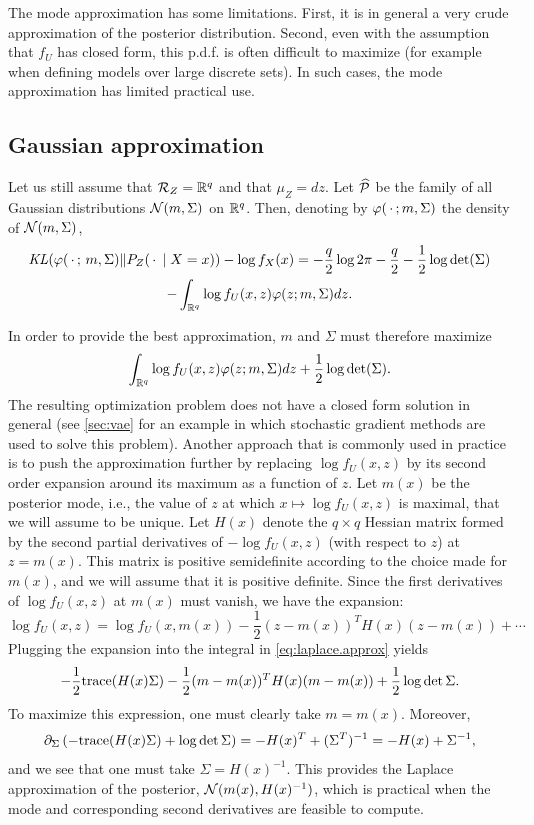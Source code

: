 The mode approximation has some limitations. First, it is in general a very crude approximation of the posterior distribution. Second, even with the assumption that  $f_U$ has closed form,  this p.d.f. is often difficult to maximize (for example when defining models over large discrete sets). In such cases, the mode approximation has limited practical use.

\subsection{Gaussian approximation}

Let us still assume that ${\mathcal R}_Z = {\mathbb{R}}^q$ and that $\mu_Z = dz$.  Let ${\widehat{\mathcal{P}}}$ be the family of all Gaussian distributions ${\mathcal N}(m, \Sigma)$ on ${\mathbb{R}}^q$. Then, denoting by $\varphi(\,\cdot\,;m,\Sigma)$ the density  of  ${\mathcal N}(m, \Sigma)$,
\begin{multline*}
\mathit{KL}(\varphi(\,\cdot\,;\,m , \Sigma) \|P_Z(\,\cdot\,\mid X=x)) - \log f_X(x) =-\frac{q}2 \log 2\pi - \frac q2 - \frac12 \log \det(\Sigma) \\
- \int_{{\mathbb{R}}^q} \log f_U(x,z) \varphi(z;m,\Sigma) dz.
\end{multline*}

In order to provide the best approximation, $m$ and $\Sigma$ must therefore maximize
\begin{equation}
\int_{{\mathbb{R}}^q} \log f_U(x,z) \varphi(z;m,\Sigma) dz + \frac12 \log \det(\Sigma).
\label{eq:laplace.approx}
\end{equation}
The resulting optimization problem does not have a closed form solution in general (see \cref{sec:vae} for an example in which stochastic gradient methods are used to solve this problem). Another approach that is commonly used in practice is to push  the approximation further by replacing $\log f_U(x,z)$ by its second order expansion around its maximum as a function of $z$. Let $m(x)$ be the posterior mode, i.e., the value of $z$ at which $x \mapsto \log f_U(x, z)$ is maximal, that we will assume to be unique. Let $H(x)$ denote the $q\times q$ Hessian matrix formed by the second partial derivatives of  $-\log f_U(x, z)$ (with respect to $z$) at $z = m(x)$. This matrix is positive semidefinite according to the choice made for  $m(x)$, and we will assume that it is positive definite. Since the first derivatives of $\log f_U(x, z)$ at $m(x)$ must vanish, we have the expansion:
\[
 \log f_U(x,z) = \log f_U(x,m(x)) - \frac12 (z-m(x))^T H(x) (z-m(x)) + \cdots
\]
 Plugging the expansion into the integral in \cref{eq:laplace.approx} yields
\[
-\frac12 {\mathrm{trace}}(H(x) \Sigma) - \frac12  (m-m(x))^T H(x) (m-m(x)) + \frac12 \log\det\Sigma.
\]
To maximize this expression, one must clearly take $m = m(x)$. Moreover, 
\[
\partial_{\Sigma}\left(-{\mathrm{trace}}(H(x) \Sigma) + \log\det\Sigma\right) = -H(x)^T + (\Sigma^T)^{-1} = -H(x) + \Sigma^{-1},
\]
and we see that  one must take $\Sigma = H(x)^{-1}$. This provides the Laplace approximation \citep{dieudonne1971infinitesimal} of the posterior, ${\mathcal N}(m(x), H(x)^{-1})$, which is practical when the mode and corresponding second derivatives are feasible to compute.

